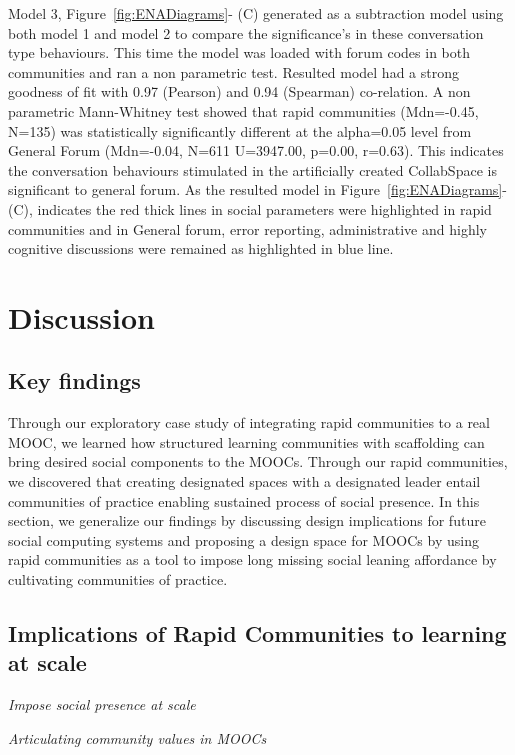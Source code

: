 \documentclass[manuscript,screen,review]{acmart}
\begin{document}
Model 3, Figure~\ref{fig:ENADiagrams}- (C) generated as a subtraction model using both model 1 and model 2 to compare the significance's in these conversation type behaviours. This time the model was loaded with forum codes in both communities and ran a non parametric test. Resulted model had a strong goodness of fit with 0.97 (Pearson) and 0.94 (Spearman) co-relation. A non parametric Mann-Whitney test showed that rapid communities (Mdn=-0.45, N=135) was statistically significantly different at the alpha=0.05 level from General Forum (Mdn=-0.04, N=611 U=3947.00, p=0.00, r=0.63). This indicates the conversation behaviours stimulated in the artificially created CollabSpace is significant to general forum. As the resulted model in Figure~\ref{fig:ENADiagrams}-(C), indicates the red thick lines in social parameters were highlighted in rapid communities and in General forum, error reporting, administrative and highly cognitive discussions were remained as highlighted in blue line.





\section{Discussion}
\subsection{Key findings}
Through our exploratory case study of integrating rapid communities to a real MOOC, we learned how structured learning communities with scaffolding can bring desired social components to the MOOCs. Through our rapid communities, we discovered that creating designated spaces with a designated leader entail communities of practice enabling sustained process of social presence.  In this section, we generalize our findings by discussing design implications for future social computing systems and proposing a design space for  MOOCs by using rapid communities as a tool to impose long missing social leaning affordance by cultivating communities of practice. 

\subsection{Implications of Rapid Communities to learning at scale}


\textit{Impose social presence at scale} 

\textit{Articulating community values in MOOCs} 
\end{document}
